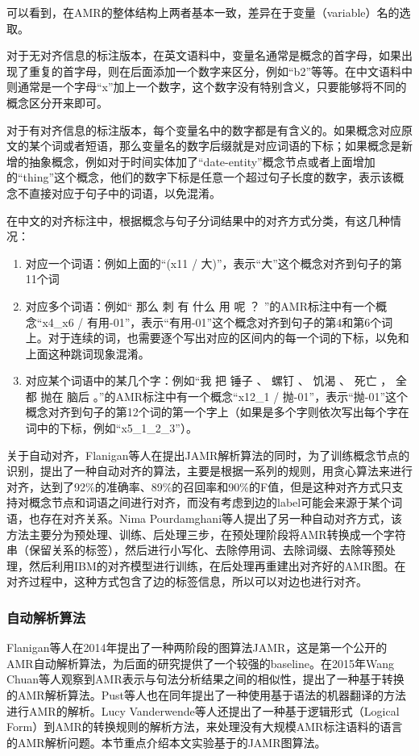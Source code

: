 \documentclass[master, winfont]{njuthesis}
\begin{document}
可以看到，在AMR的整体结构上两者基本一致，差异在于变量（variable）名的选取。

对于无对齐信息的标注版本，在英文语料中，变量名通常是概念的首字母，如果出现了重复的首字母，则在后面添加一个数字来区分，例如“b2”等等。在中文语料中则通常是一个字母“x”加上一个数字，这个数字没有特别含义，只要能够将不同的概念区分开来即可。

对于有对齐信息的标注版本，每个变量名中的数字都是有含义的。如果概念对应原文的某个词或者短语，那么变量名的数字后缀就是对应词语的下标；如果概念是新增的抽象概念，例如对于时间实体加了“date-entity”概念节点或者上面增加的“thing”这个概念，他们的数字下标是任意一个超过句子长度的数字，表示该概念不直接对应于句子中的词语，以免混淆。

在中文的对齐标注中，根据概念与句子分词结果中的对齐方式分类，有这几种情况：
\begin{enumerate}
	\item 对应一个词语：例如上面的“(x11 / 大)”，表示“大”这个概念对齐到句子的第11个词
	\item 对应多个词语：例如“ 那么 刺 有 什么 用 呢 ？ ”的AMR标注中有一个概念“x4\_x6 / 有用-01”，表示“有用-01”这个概念对齐到句子的第4和第6个词上。对于连续的词，也需要逐个写出对应的区间内的每一个词的下标，以免和上面这种跳词现象混淆。
	\item 对应某个词语中的某几个字：例如“我 把 锤子 、 螺钉 、 饥渴 、 死亡 ， 全都 抛在 脑后 。”的AMR标注中有一个概念“x12\_1 / 抛-01”，表示“抛-01”这个概念对齐到句子的第12个词的第一个字上（如果是多个字则依次写出每个字在词中的下标，例如“x5\_1\_2\_3”）。
\end{enumerate}

关于自动对齐，Flanigan等人\cite{Flanigan2014}在提出JAMR解析算法的同时，为了训练概念节点的识别，提出了一种自动对齐的算法，主要是根据一系列的规则，用贪心算法来进行对齐，达到了92\%的准确率、89\%的召回率和90\%的F值，但是这种对齐方式只支持对概念节点和词语之间进行对齐，而没有考虑到边的label可能会来源于某个词语，也存在对齐关系。Nima Pourdamghani等人\cite{Pourdamghani2014}提出了另一种自动对齐方式，该方法主要分为预处理、训练、后处理三步，在预处理阶段将AMR转换成一个字符串（保留关系的标签），然后进行小写化、去除停用词、去除词缀、去除等预处理，然后利用IBM的对齐模型进行训练，在后处理再重建出对齐好的AMR图。在对齐过程中，这种方式包含了边的标签信息，所以可以对边也进行对齐。

\subsubsection{自动解析算法}
Flanigan等人\cite{Flanigan2014}在2014年提出了一种两阶段的图算法JAMR，这是第一个公开的AMR自动解析算法，为后面的研究提供了一个较强的baseline。在2015年Wang Chuan\cite{Wang2015}等人观察到AMR表示与句法分析结果之间的相似性，提出了一种基于转换的AMR解析算法。Pust等人\cite{Pust2015}也在同年提出了一种使用基于语法的机器翻译的方法进行AMR的解析。Lucy Vanderwende等人\cite{Vanderwende2015}还提出了一种基于逻辑形式（Logical Form）到AMR的转换规则的解析方法，来处理没有大规模AMR标注语料的语言的AMR解析问题。本节重点介绍本文实验基于的JAMR图算法。
\end{document}
